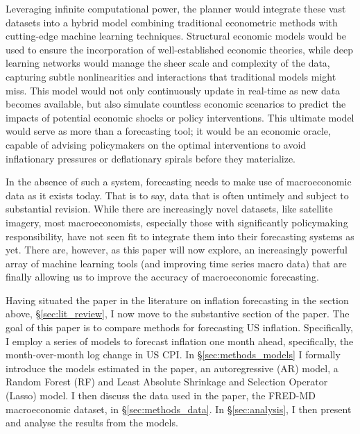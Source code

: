 Leveraging infinite computational power, the planner would integrate these vast datasets into a hybrid model combining traditional econometric methods with cutting-edge machine learning techniques. Structural economic models would be used to ensure the incorporation of well-established economic theories, while deep learning networks would manage the sheer scale and complexity of the data, capturing subtle nonlinearities and interactions that traditional models might miss. This model would not only continuously update in real-time as new data becomes available, but also simulate countless economic scenarios to predict the impacts of potential economic shocks or policy interventions. This ultimate model would serve as more than a forecasting tool; it would be an economic oracle, capable of advising policymakers on the optimal interventions to avoid inflationary pressures or deflationary spirals before they materialize. 

In the absence of such a system, forecasting needs to make use of macroeconomic data as it exists today. That is to say, data that is often untimely and subject to substantial revision. While there are increasingly novel datasets, like satellite imagery, most macroeconomists, especially those with significantly policymaking responsibility, have not seen fit to integrate them into their forecasting systems as yet. There are, however, as this paper will now explore, an increasingly powerful array of machine learning tools (and improving time series macro data) that are finally allowing us to improve the accuracy of macroeconomic forecasting.

Having situated the paper in the literature on inflation forecasting in the section above, \S \ref{sec:lit_review}, I now move to the substantive section of the paper. The goal of this paper is to compare methods for forecasting US inflation. Specifically, I employ a series of models to forecast inflation one month ahead, specifically, the month-over-month log change in US CPI. In \S \ref{sec:methods_models} I formally introduce the models estimated in the paper, an autoregressive (AR) model, a Random Forest (RF) and Least Absolute Shrinkage and Selection Operator (Lasso) model. I then discuss the data used in the paper, the FRED-MD macroeconomic dataset, in \S \ref{sec:methods_data}. In \S \ref{sec:analysis}, I then present and analyse the results from the models. 
